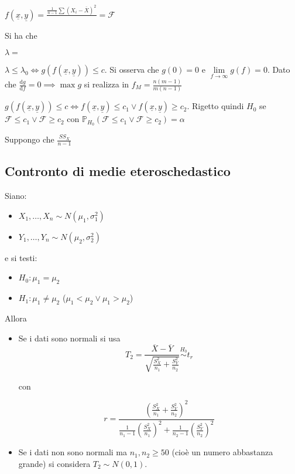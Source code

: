\documentclass[hidelinks, 10pt]{report}
\begin{document}
$ f(\underline{x}, \underline{y}) = \frac{\frac{1}{n - 1} \sum (X_{i} - \overline{X})^{2}}{} = \mathcal{F} $

Si ha che

$ \lambda =  $ %


$\lambda \le \lambda_{0} \iff g(f(\underline{x}, \underline{y})) \le c $. Si osserva che $ g(0) = 0 $ e $ \lim\limits_{f \to \infty} g(f) = 0 $. Dato che $ \frac{\mathrm{d}g}{\mathrm{d}f} = 0 \implies \max g $ si realizza in $ f_{M} = \frac{n(m - 1)}{m (n - 1)} $


$ g(f(\underline{x}, \underline{y})) \le c \iff f(\underline{x}, \underline{y}) \le c_{1} \lor f(\underline{x}, \underline{y}) \ge c_{2} $. Rigetto quindi $ H_{0} $ se $ \mathcal{F} \le c_{1} \lor \mathcal{F} \ge c_{2} $ con $ \mathbb{P}_{H_{0}} (\mathcal{F} \le c_{1} \lor \mathcal{F} \ge c_{2}) = \alpha $


Suppongo che $ \frac{SS_{X}}{n - 1} $


\subsection{Contronto di medie eteroschedastico}

Siano:
\begin{itemize}
\item $ X_{1}, \dotsc, X_{n} \sim N(\mu_{1}, \sigma_{1}^{2}) $
\item $ Y_{1}, \dotsc, Y_{n} \sim N(\mu_{2}, \sigma_{2}^{2}) $
\end{itemize}

e si testi:
\begin{itemize}
\item $ H_{0}: \mu_{1} = \mu_{2} $
\item $ H_{1}: \mu_{1} \ne \mu_{2} $ ($ \mu_{1} < \mu_{2} \lor \mu_{1} > \mu_{2} $)
\end{itemize}

Allora
\begin{itemize}
\item Se i dati sono normali si usa
\[ T_{2} = \frac{\overline{X} - \overline{Y}}{\sqrt{\frac{S_{X}^{2}}{n_{1}} + \frac{S_{Y}^{2}}{n_{2}}}} \stackrel{H_{0}}{\sim} t_{r} \]

con

\[ r = \frac{\left( \frac{S_{X}^{2}}{n_{1}} + \frac{S_{Y}^{2}}{n_{2}} \right)^{2}}{\frac{1}{n_{1} - 1} \left( \frac{S_{X}^{2}}{n_{1}} \right)^{2} + \frac{1}{n_{2} - 1} \left( \frac{S_{Y}^{2}}{n_{2}} \right)^{2}} \]

\item Se i dati non sono normali ma $ n_{1}, n_{2} \ge 50 $ (cio\`e un numero abbastanza grande) si considera $ T_{2} \sim N(0,1) $.
\end{itemize}
\end{document}
